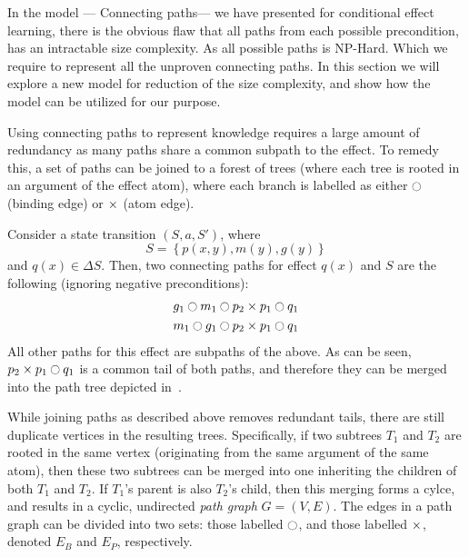 \documentclass[\master/Master.tex]{subfiles}
\begin{document}
In the model --- Connecting paths--- we have presented for conditional effect learning, there is the obvious flaw that all paths from each possible precondition, has an intractable size complexity. 
As all possible paths is NP-Hard. Which we require to represent all  the unproven connecting paths. 
In this section we will explore a new model for reduction of the size complexity, and show how the model can be utilized for our purpose. 

Using connecting paths to represent knowledge requires a large amount of redundancy as many paths share a common subpath to the effect. To remedy this, a set of paths can be joined to a forest of trees (where each tree is rooted in an argument of the effect atom), where each branch is labelled as either $\ocircle$ (binding edge) or $\times$ (atom edge).

\begin{example}\label{ex:ca:pathTrees}
    Consider a state transition $\left( S, a, S' \right)$, where 
    \begin{equation*}
        S = \left\{ p(x, y), m(y), g(y) \right\}
    \end{equation*}
    and $q(x) \in \Delta S$. Then, two connecting paths for effect $q(x)$ and $S$ are the following (ignoring negative preconditions):
    \begin{align*}
        & g_1 \ocircle m_1 \ocircle p_2 \times p_1 \ocircle q_1 \\
        & m_1 \ocircle g_1 \ocircle p_2 \times p_1 \ocircle q_1
    \end{align*}
    All other paths for this effect are subpaths of the above. As can be seen, $p_2 \times p_1 \ocircle q_1$ is a common tail of both paths, and therefore they can be merged into the path tree depicted in~.
\end{example}

While joining paths as described above removes redundant tails, there are still duplicate vertices in the resulting trees. Specifically, if two subtrees $T_1$ and $T_2$ are rooted in the same vertex (originating from the same argument of the same atom), then these two subtrees can be merged into one inheriting the children of both $T_1$ and $T_2$. If $T_1$'s parent is also $T_2$'s child, then this merging forms a cylce, and results in a cyclic, undirected \emph{path graph} $G = (V, E)$. The edges in a path graph can be divided into two sets: those labelled $\ocircle$, and those labelled $\times$, denoted $E_B$ and $E_P$, respectively.
\end{document}
